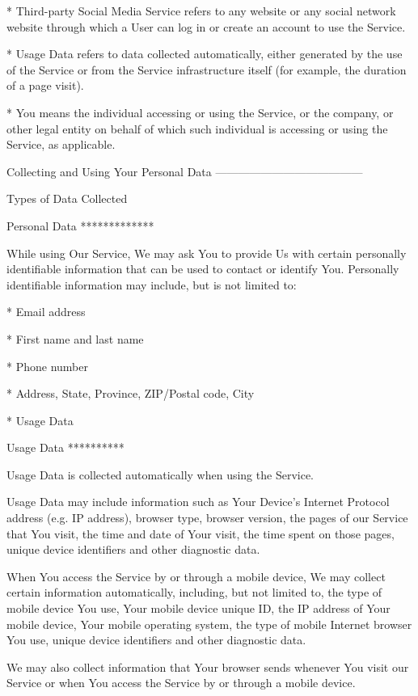   * Third-party Social Media Service refers to any website or any social
    network website through which a User can log in or create an account to
    use the Service.

  * Usage Data refers to data collected automatically, either generated by the
    use of the Service or from the Service infrastructure itself (for example,
    the duration of a page visit).

  * You means the individual accessing or using the Service, or the company,
    or other legal entity on behalf of which such individual is accessing or
    using the Service, as applicable.


Collecting and Using Your Personal Data  
---------------------------------------

Types of Data Collected  
~~~~~~~~~~~~~~~~~~~~~~~

Personal Data  
*************

While using Our Service, We may ask You to provide Us with certain personally
identifiable information that can be used to contact or identify You.
Personally identifiable information may include, but is not limited to:

  * Email address

  * First name and last name

  * Phone number

  * Address, State, Province, ZIP/Postal code, City

  * Usage Data


Usage Data  
**********

Usage Data is collected automatically when using the Service.

Usage Data may include information such as Your Device's Internet Protocol
address (e.g. IP address), browser type, browser version, the pages of our
Service that You visit, the time and date of Your visit, the time spent on
those pages, unique device identifiers and other diagnostic data.

When You access the Service by or through a mobile device, We may collect
certain information automatically, including, but not limited to, the type of
mobile device You use, Your mobile device unique ID, the IP address of Your
mobile device, Your mobile operating system, the type of mobile Internet
browser You use, unique device identifiers and other diagnostic data.

We may also collect information that Your browser sends whenever You visit our
Service or when You access the Service by or through a mobile device.

